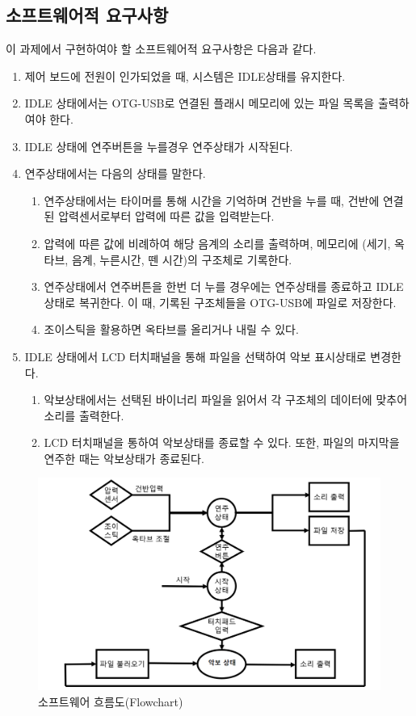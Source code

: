 \documentclass[a4paper, 11pt]{article}
\begin{document}
\subsection{소프트웨어적 요구사항}
  이 과제에서 구현하여야 할 소프트웨어적 요구사항은 다음과 같다. 
\begin{enumerate}
\item 제어 보드에 전원이 인가되었을 때, 시스템은 IDLE상태를 유지한다. 
\item IDLE 상태에서는 OTG-USB로 연결된 플래시 메모리에 있는 파일 목록을 출력하여야 한다. 
\item IDLE 상태에 연주버튼을 누를경우 연주상태가 시작된다. 
\item 연주상태에서는 다음의 상태를 말한다. 
\begin{enumerate}
\item 연주상태에서는 타이머를 통해 시간을 기억하며 건반을 누를 때, 건반에 연결된 압력센서로부터 압력에 따른 값을 입력받는다.
\item 압력에 따른 값에 비례하여 해당 음계의 소리를 출력하며, 메모리에 (세기, 옥타브, 음계, 누른시간, 뗀 시간)의 구조체로 기록한다. 
\item 연주상태에서 연주버튼을 한번 더 누를 경우에는 연주상태를 종료하고 IDLE 상태로 복귀한다. 이 때, 기록된 구조체들을 OTG-USB에 파일로 저장한다.   
\item 조이스틱을 활용하면 옥타브를 올리거나 내릴 수 있다. 
\end{enumerate}
\item IDLE 상태에서 LCD 터치패널을 통해 파일을 선택하여 악보 표시상태로 변경한다. 
\begin{enumerate}
\item 악보상태에서는 선택된 바이너리 파일을 읽어서 각 구조체의 데이터에 맞추어 소리를 출력한다.
\item LCD 터치패널을 통하여 악보상태를 종료할 수 있다. 또한, 파일의 마지막을 연주한 때는 악보상태가 종료된다.  
\end{enumerate}
\end{enumerate}

\begin{figure}[h!]
\centering
\includegraphics[width=\linewidth]{./Figure/SW.png}
\caption{소프트웨어 흐름도(Flowchart)}
\label{Fig:Fig1}
\end{figure}
\end{document}
